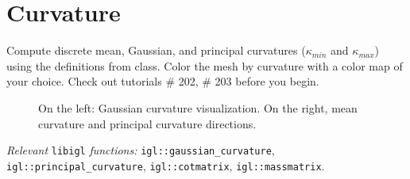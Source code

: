 \documentclass[11pt]{amsart}
\begin{document}
\section{Curvature}
Compute discrete mean, Gaussian, and principal curvatures ($\kappa_{min}$ and
$\kappa_{max}$) using the definitions from class. Color the mesh by curvature
with a color map of your choice. Check out tutorials \# 202, \# 203 before you
begin.  

\begin{figure}[h!]
   \centering
\hspace{1.5cm}
   \caption{On the left: Gaussian curvature visualization. On the right,
    mean curvature and principal curvature directions.}
   \label{fig:beetle}
\end{figure}

\emph{Relevant} \texttt{libigl} \emph{functions: }
\texttt{igl::gaussian\_curvature}, \texttt{igl::principal\_curvature},
\texttt{igl::cotmatrix}, \texttt{igl::massmatrix}.
\end{document}
